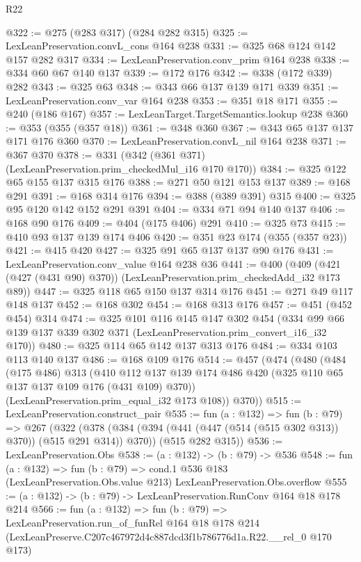 \begin{lexlean}{R22}
\begin{coremodule}
@322 := @275 (@283 @317) (@284 @282 @315)
@325 := LexLeanPreservation.convL_cons @164 @238
@331 := @325 @68 @124 @142 @157 @282 @317
@334 := LexLeanPreservation.conv_prim @164 @238
@338 := @334 @60 @67 @140 @137
@339 := @172 @176
@342 := @338 (@172 @339) @282
@343 := @325 @63
@348 := @343 @66 @137 @139 @171 @339
@351 := LexLeanPreservation.conv_var @164 @238
@353 := @351 @18 @171
@355 := @240 (@186 @167)
@357 := LexLeanTarget.TargetSemantics.lookup @238
@360 := @353 (@355 (@357 @18))
@361 := @348 @360
@367 := @343 @65 @137 @137 @171 @176 @360
@370 := LexLeanPreservation.convL_nil @164 @238
@371 := @367 @370
@378 := @331 (@342 (@361 @371) (LexLeanPreservation.prim_checkedMul_i16 @170 @170))
@384 := @325 @122 @65 @155 @137 @315 @176
@388 := @271 @50 @121 @153 @137
@389 := @168 @291
@391 := @168 @314 @176
@394 := @388 (@389 @391) @315
@400 := @325 @95 @120 @142 @152 @291 @391
@404 := @334 @71 @94 @140 @137
@406 := @168 @90 @176
@409 := @404 (@175 @406) @291
@410 := @325 @73
@415 := @410 @93 @137 @139 @174 @406
@420 := @351 @23 @174 (@355 (@357 @23))
@421 := @415 @420
@427 := @325 @91 @65 @137 @137 @90 @176
@431 := LexLeanPreservation.conv_value @164 @238 @36
@441 := @400 (@409 (@421 (@427 (@431 @90) @370)) (LexLeanPreservation.prim_checkedAdd_i32 @173 @89))
@447 := @325 @118 @65 @150 @137 @314 @176
@451 := @271 @49 @117 @148 @137
@452 := @168 @302
@454 := @168 @313 @176
@457 := @451 (@452 @454) @314
@474 := @325
    @101
    @116
    @145
    @147
    @302
    @454
    (@334 @99 @66 @139 @137 @339 @302 @371 (LexLeanPreservation.prim_convert_i16_i32 @170))
@480 := @325 @114 @65 @142 @137 @313 @176
@484 := @334 @103 @113 @140 @137
@486 := @168 @109 @176
@514 := @457
    (@474
      (@480
        (@484
          (@175 @486)
          @313
          (@410 @112 @137 @139 @174 @486 @420 (@325 @110 @65 @137 @137 @109 @176 (@431 @109) @370))
          (LexLeanPreservation.prim_equal_i32 @173 @108))
        @370))
@515 := LexLeanPreservation.construct_pair
@535 := fun (a : @132) =>
  fun (b : @79) =>
  @267
    (@322
      (@378 (@384 (@394 (@441 (@447 (@514 (@515 @302 @313)) @370)) (@515 @291 @314)) @370))
      (@515 @282 @315))
@536 := LexLeanPreservation.Obs
@538 := (a : @132) -> (b : @79) -> @536
@548 := fun (a : @132) =>
  fun (b : @79) =>
  cond.{1} @536 @183 (LexLeanPreservation.Obs.value @213) LexLeanPreservation.Obs.overflow
@555 := (a : @132) -> (b : @79) -> LexLeanPreservation.RunConv @164 @18 @178 @214
@566 := fun (a : @132) =>
  fun (b : @79) =>
  LexLeanPreservation.run_of_funRel
    @164
    @18
    @178
    @214
    (LexLeanPreserve.C207c467972d4c887dcd3f1b786776d1a.R22.__rel_0 @170 @173)
\end{coremodule}
\end{lexlean}
